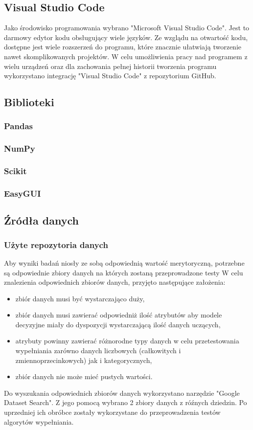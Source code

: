 \documentclass[12pt,twoside]{article}
\begin{document}
\subsection{Visual Studio Code}

Jako środowisko programowania wybrano "Microsoft Visual Studio Code".
Jest to darmowy edytor kodu obsługujący wiele języków.
Ze wzglądu na otwartość kodu, dostępne jest wiele rozszerzeń do programu,
które znacznie ułatwiają tworzenie nawet skomplikowanych projektów.
W celu umożliwienia pracy nad programem z wielu urządzeń
oraz dla zachowania pełnej historii tworzenia programu wykorzystano integrację "Visual Studio Code" z repozytorium GitHub.
\subsection{Biblioteki}
\subsubsection{Pandas}
\subsubsection{NumPy}
\subsubsection{Scikit}
\subsubsection{EasyGUI}
\subsection{Źródła danych}

\subsubsection{Użyte repozytoria danych}

Aby wyniki badań niosły ze sobą odpowiednią wartość merytoryczną,
potrzebne są odpowiednie zbiory danych na których zostaną przeprowadzone testy
W celu znalezienia odpowiednich zbiorów danych, przyjęto następujące założenia:
\begin{itemize}[label=-,labelsep=0.4cm, leftmargin=1.25cm]
    \item zbiór danych musi być wystarczająco duży,
    \item zbiór danych musi zawierać odpowiedniż ilość atrybutów aby modele decyzyjne miały
    do dyspozycji wystarczającą ilość danych uczących,
    \item atrybuty powinny zawierać różnorodne typy danych w celu przetestowania wypełniania zarówno danych
    liczbowych (całkowitych i zmiennoprzecinkowych) jak i kategorycznych,
    \item zbiór danych nie może mieć pustych wartości.
\end{itemize}
Do wyszukania odpowiednich zbiorów danych wykorzystano narzędzie "Google Dataset Search".
Z jego pomocą wybrano 2 zbiory danych z róźnych dziedzin.
Po uprzedniej ich obróbce zostały wykorzystane do przeprowadzenia testów algorytów wypełniania.
\end{document}
